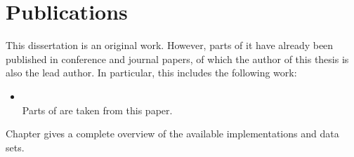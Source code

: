 %
\chapter*{Publications}
\label{ch:publication}

This dissertation is an original work. 
However, parts of it have already been published in conference and journal papers, of which the author of this thesis is also the lead author.
In particular, this includes the following work:

\begin{itemize}[leftmargin=*]
	\item {} \\ Parts of  are taken from this paper.
	
\end{itemize}	

Chapter  gives a complete overview of the available implementations and data sets.